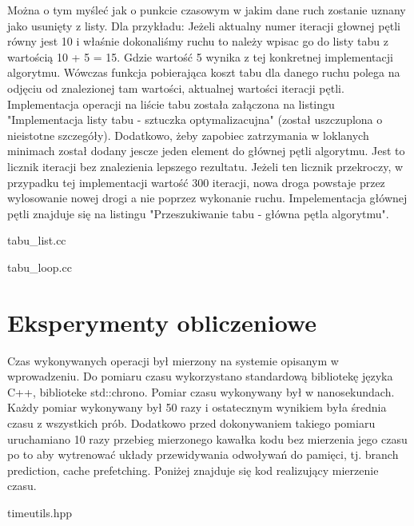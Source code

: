 \documentclass[polish,polish,a4paper]{article}
\begin{document}
Można o tym myśleć jak o punkcie czasowym w jakim dane ruch zostanie uznany jako usunięty z listy. Dla przykładu:
Jeżeli aktualny numer iteracji głownej pętli równy jest 10 i właśnie dokonaliśmy ruchu to należy wpisac go do listy tabu z wartością
10 + 5 = 15. Gdzie wartość 5 wynika z tej konkretnej implementacji algorytmu. Wówczas funkcja pobierająca koszt tabu dla danego
ruchu polega na odjęciu od znalezionej tam wartości, aktualnej wartości iteracji pętli. Implementacja operacji na liście tabu
została załączona na listingu "Implementacja listy tabu - sztuczka optymalizacujna" (został uszczuplona o nieistotne szczegóły).
Dodatkowo, żeby zapobiec zatrzymania w loklanych minimach został dodany jescze jeden element do głównej pętli algorytmu.
Jest to licznik iteracji bez znalezienia lepszego rezultatu. Jeżeli ten licznik przekroczy, w przypadku tej implementacji wartość
300 iteracji, nowa droga powstaje przez wylosowanie nowej drogi a nie poprzez wykonanie ruchu. Impelementacja głównej pętli znajduje
się na listingu "Przeszukiwanie tabu - główna pętla algorytmu".

\pagebreak

{tabu_list.cc}

\pagebreak

{tabu_loop.cc}

\pagebreak
\section{Eksperymenty obliczeniowe}
Czas wykonywanych operacji był mierzony na systemie opisanym w wprowadzeniu.
Do pomiaru czasu wykorzystano standardową bibliotekę języka C++, biblioteke std::chrono.
Pomiar czasu wykonywany był w nanosekundach. Każdy pomiar wykonywany był 50 razy i ostatecznym wynikiem była średnia czasu z wszystkich prób.
Dodatkowo przed dokonywaniem takiego pomiaru uruchamiano 10 razy przebieg mierzonego kawałka kodu bez mierzenia jego czasu po to aby wytrenować układy przewidywania odwoływań do pamięci,
tj. branch prediction, cache prefetching.
Poniżej znajduje się kod realizujący mierzenie czasu.


{timeutils.hpp}
\end{document}
